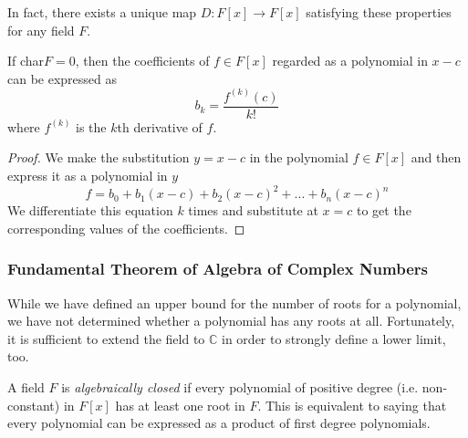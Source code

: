 \documentclass{article}
\begin{document}
      In fact, there exists a unique map $D: F[x] \longrightarrow F[x]$ satisfying these properties for any field $F$. 

      \begin{proposition}
        If char$F = 0$, then the coefficients of $f \in F[x]$ regarded as a polynomial in $x - c$ can be expressed as 
        \begin{equation}
          b_k = \frac{ f^{(k)} (c)}{k!}
        \end{equation}
        where $f^{(k)}$ is the $k$th derivative of $f$. 
      \end{proposition}
      \begin{proof}
        We make the substitution $ y = x-c$ in the polynomial $f \in F[x]$ and then express it as a polynomial in $y$ 
        \begin{equation}
          f = b_0 + b_1 (x-c) + b_2 (x-c)^2 + ... + b_n (x-c)^n
        \end{equation}
        We differentiate this equation $k$ times and substitute at $x = c$ to get the corresponding values of the coefficients.
      \end{proof}

    \subsubsection{Fundamental Theorem of Algebra of Complex Numbers}

      While we have defined an upper bound for the number of roots for a polynomial, we have not determined whether a polynomial has any roots at all. Fortunately, it is sufficient to extend the field to $\mathbb{C}$ in order to strongly define a lower limit, too. 

      \begin{definition}
        A field $F$ is \textit{algebraically closed} if every polynomial of positive degree (i.e. non-constant) in $F[x]$ has at least one root in $F$. This is equivalent to saying that every polynomial can be expressed as a product of first degree polynomials.
      \end{definition}
\end{document}
